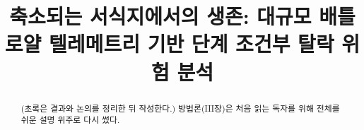 \documentclass[conference]{IEEEtran}
\newcommand{\rev}[1]{{\color{revblue}#1}}
\begin{document}
\title{축소되는 서식지에서의 생존: 대규모 배틀로얄 텔레메트리 기반 단계 조건부 탈락 위험 분석}
\author{}
\maketitle

\begin{abstract}
(초록은 결과와 논의를 정리한 뒤 작성한다.) \rev{방법론(III장)은 처음 읽는 독자를 위해 전체를 쉬운 설명 위주로 다시 썼다.}
\end{abstract}







\end{document}
